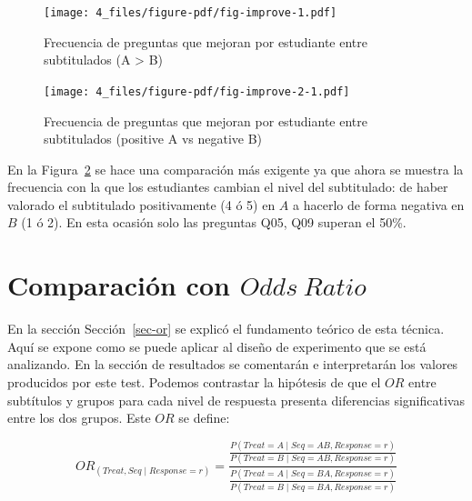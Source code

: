 \documentclass[
  12pt,
  a4paper,
  extrafontsizes,
  onecolumn,
  openright]{memoir}
\begin{document}
\begin{figure}[h]

{\centering \texttt{[image: 4\_files/figure-pdf/fig-improve-1.pdf]}

}

\caption{\label{fig-improve}Frecuencia de preguntas que mejoran por
estudiante entre subtitulados (A \textgreater{} B)}

\end{figure}

\begin{figure}[h]

{\centering \texttt{[image: 4\_files/figure-pdf/fig-improve-2-1.pdf]}

}

\caption{\label{fig-improve-2}Frecuencia de preguntas que mejoran por
estudiante entre subtitulados (positive A vs negative B)}

\end{figure}

En la Figura~\ref{fig-improve-2} se hace una comparación más exigente ya
que ahora se muestra la frecuencia con la que los estudiantes cambian el
nivel del subtitulado: de haber valorado el subtitulado positivamente (4
ó 5) en \(A\) a hacerlo de forma negativa en \(B\) (1 ó 2). En esta
ocasión solo las preguntas Q05, Q09 superan el 50\%.

\hypertarget{sec-or-2}{%
\section{\texorpdfstring{Comparación con
\(Odds\ Ratio\)}{Comparación con Odds\textbackslash{} Ratio}}\label{sec-or-2}}

En la sección Sección~\ref{sec-or} se explicó el fundamento teórico de
esta técnica. Aquí se expone como se puede aplicar al diseño de
experimento que se está analizando. En la sección de resultados se
comentarán e interpretarán los valores producidos por este test. Podemos
contrastar la hipótesis de que el \(OR\) entre subtítulos y grupos para
cada nivel de respuesta presenta diferencias significativas entre los
dos grupos. Este \(OR\) se define:

\begin{equation}
OR_{(Treat, Seq \mid Response=r)}=\frac{
    \frac{
            P(Treat=A \mid Seq=AB, Response=r)
        }{
            P(Treat=B \mid Seq=AB, Response=r)
        }
    }
    {\frac{
        P(Treat=A \mid Seq=BA, Response=r)
        }{
        P(Treat=B \mid Seq=BA, Response=r)
    }
}
\end{equation}
\end{document}
